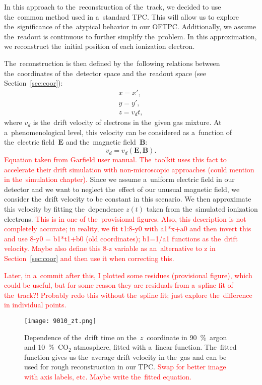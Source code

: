 		In this approach to the~reconstruction of the~track, we decided to use the~common method used in a~standard \ac{TPC}. This will allow us to explore the~significance of the~atypical behavior in our \ac{OFTPC}. Additionally, we assume the~readout is continuous to further simplify the~problem. In this approximation, we reconstruct the~initial position of each ionization electron.
		
		The~reconstruction is then defined by the~following relations between the~coordinates of the~detector space and the~readout space (see Section~\ref{sec:coor}):
			\begin{eqnarray}
				x = x',\\
				y = y',\\
				z = v_d t,
			\end{eqnarray}
		where $v_d$ is the~drift velocity of electrons in the~given gas mixture. At a~phenomenological level, this velocity can be considered as a~function of the~electric field~$\bm{E}$ and the~magnetic field~$\bm{B}$:
			\begin{equation}
				v_d = v_d(\bm{E},\bm{B}).
			\end{equation}
		\textcolor{red}{Equation taken from Garfield user manual. The~\garfieldpp toolkit uses this fact to accelerate their drift simulation with non-microscopic approaches (could mention in the~simulation chapter).} Since we assume a~uniform electric field in our detector and we want to neglect the~effect of our unusual magnetic field, we consider the~drift velocity to be constant in this scenario. We then approximate this velocity by fitting the~dependence $z(t)$ taken from the~simulated ionization electrons. \textcolor{red}{This is in one of the~provisional figures. Also, this description is not completely accurate; in reality, we fit t1:8-y0 with a1*x+a0 and then invert this and use 8-y0 = b1*t1+b0 (old coordinates); b1=1/a1 functions as the~drift velocity. Maybe also define this 8-z variable as an~alternative to z in Section~\ref{sec:coor} and then use it when correcting this.}
		
		\textcolor{red}{Later, in a~commit after this, I plotted some residues (provisional figure), which could be useful, but for some reason they are residuals from a~spline fit of the~track?! Probably redo this without the~spline fit; just explore the~difference in individual points.}
		
		\begin{figure}[H]
			\centering
			\texttt{[image: 9010\_zt.png]}
			\caption{Dependence of the~drift time on the~$z$~coordinate in 90~\%~argon and 10~\%~CO$_2$ atmosphere, fitted with a~linear function. The~fitted function gives us the~average drift velocity in the~gas and can be used for rough reconstruction in our \ac{TPC}. \textcolor{red}{Swap for better image with axis labels, etc. Maybe write the~fitted equation.}}
			\label{fig:9010zt}
		\end{figure}
		

